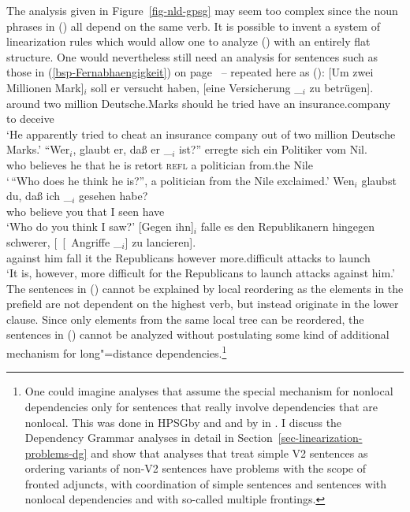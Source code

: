 The analysis given in Figure~\ref{fig-nld-gpsg} may seem too complex since the noun phrases in () all depend on the same verb. It is possible to invent a system
of linearization rules which would allow one to analyze () with an entirely flat structure. One would nevertheless still need an analysis for sentences such as those in 
(\ref{bsp-Fernabhaengigkeit}) on
page~\pageref{bsp-Fernabhaengigkeit} -- repeated here as ():
\eal
\ex\label{bsp-um-zwei-millionen-zwei}
\gll {}[Um zwei Millionen Mark]$_i$ soll er versucht haben, [eine Versicherung \_$_i$ zu betrügen].\footnotemark\\
     {}\spacebr{}around two million Deutsche.Marks should he tried have \spacebr{}an insurance.company {} to deceive\\
\glt `He apparently tried to cheat an insurance company out of two million Deutsche Marks.'
\ex
\gll "`Wer$_i$, glaubt er, daß er \_$_i$ ist?"' erregte sich ein Politiker vom Nil.\footnotemark\\
     \spacebr{}who believes he that he {} is retort \textsc{refl} a politician from.the Nile\\
\glt `\,``Who does he think he is?'', a politician from the Nile exclaimed.'
\ex\label{ex-wen-glaubst-du-dass-zwei}
\gll Wen$_i$ glaubst du, daß ich \_$_i$ gesehen habe?\footnotemark\\
     who believe you that I {} seen have\\
\glt `Who do you think I saw?'
\ex 
\gll {}[Gegen ihn]$_i$ falle es den Republikanern hingegen schwerer, [~[~Angriffe \_$_i$] zu lancieren].\footnotemark\\
	 {}\spacebr{}against him fall it the Republicans however more.difficult \hspaceThis{[~[~}attacks {} to launch\\
\glt `It is, however, more difficult for the Republicans to launch attacks against him.'
\zl
The sentences in () cannot be explained by local reordering as the elements in the prefield are not dependent on the highest verb, but instead originate in the lower clause.
Since only elements from the same local tree can be reordered, the sentences in () cannot be analyzed without postulating some kind of additional mechanism for long"=distance
dependencies.\footnote{
  One could imagine analyses that assume the special mechanism for nonlocal dependencies only for
  sentences that really involve dependencies that are nonlocal. This was done in HPSG\indexhpsg by
  \citet{Kathol95a} and \citet{Wetta2011a} and by \citet{GO2009a} in \dg. I discuss the Dependency
  Grammar analyses in detail in Section~\ref{sec-linearization-problems-dg} and show that analyses
  that treat simple V2 sentences as ordering variants of non-V2 sentences have problems with the scope of
  fronted adjuncts, with coordination of simple sentences and sentences with nonlocal dependencies
  and with so-called multiple frontings.
}

